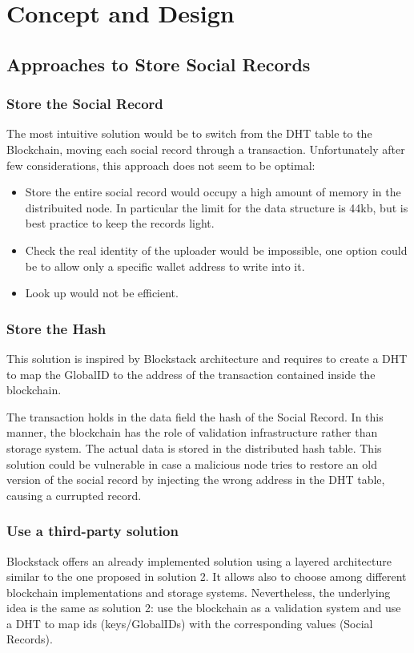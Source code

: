\chapter{Concept and Design}
\label{chapter:concept}
\section{Approaches to Store Social Records}
\subsection{Store the Social Record}
The most intuitive solution would be to switch from the DHT table to the Blockchain, moving each social record through a transaction.
Unfortunately after few considerations, this approach does not seem to be optimal:
\begin{itemize}
	\item Store the entire social record would occupy a high amount of memory in the distribuited node.
	In particular the limit for the data structure is 44kb, but is best practice to keep the records light.
	\item Check the real identity of the uploader would be impossible, one option could be to allow only a specific wallet address to write into it.
	\item Look up would not be efficient.
\end{itemize}


\subsection{Store the Hash}
This solution is inspired by Blockstack architecture and requires to create a DHT to map the GlobalID to the address of the transaction contained inside the blockchain.

The transaction holds in the data field the hash of the Social Record. In this manner, the blockchain has the role of validation infrastructure rather than storage system. The actual data is stored in the distributed hash table. This solution could be vulnerable in case a malicious node tries to restore an old version of the social record by injecting the wrong address in the DHT table, causing a currupted record.

\subsection{Use a third-party solution}
Blockstack offers an already implemented solution using a layered architecture similar to the one proposed in solution 2. It allows also to choose among different blockchain implementations and storage systems. Nevertheless, the underlying idea is the same as solution 2: use the blockchain as a validation system and use a DHT to map ids (keys/GlobalIDs) with the corresponding values (Social Records).

